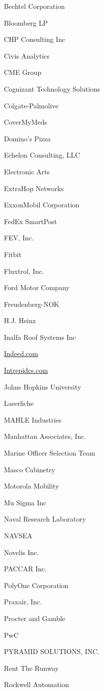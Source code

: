 \documentclass[twoside]{article}
\begin{document}
\begin{center}
\begin{multicols}{5}
\begin{FlushLeft}
\begin{compactitem}
\item Bechtel Corporation
\item Bloomberg LP
\item CHP Consulting Inc
\item Civis Analytics
\item CME Group
\item Cognizant Technology Solutions
\item Colgate-Palmolive
\item CoverMyMeds
\item Domino's Pizza
\item Echelon Consulting, LLC
\item Electronic Arts
\item ExtraHop Networks
\item ExxonMobil Corporation
\item FedEx SmartPost
\item FEV, Inc.
\item Fitbit
\item Fluxtrol, Inc.
\item Ford Motor Company
\item Freudenberg-NOK
\item H.J. Heinz
\item Inalfa Roof Systems Inc
\item \url{Indeed.com}
\item \url{Intrepidcs.com}
\item Johns Hopkins University
\item Laserfiche
\item MAHLE Industries
\item Manhattan Associates, Inc.
\item Marine Officer Selection Team
\item Masco Cabinetry
\item Motorola Mobility
\item Mu Sigma Inc
\item Naval Research Laboratory
\item NAVSEA
\item Novelis Inc.
\item PACCAR Inc.
\item PolyOne Corporation
\item Praxair, Inc.
\item Procter and Gamble
\item PwC
\item PYRAMID SOLUTIONS, INC.
\item Rent The Runway
\item Rockwell Automation

\end{compactitem}
\end{FlushLeft}
\end{multicols}
\end{center}
\end{document}
